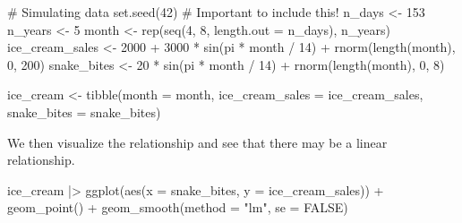 \documentclass[
  letterpaper,
  DIV=11,
  numbers=noendperiod]{scrreprt}
\newenvironment{Shaded}{\begin{snugshade}}{\end{snugshade}}
\newcommand{\AttributeTok}[1]{\textcolor[rgb]{0.40,0.45,0.13}{#1}}
\newcommand{\CommentTok}[1]{\textcolor[rgb]{0.37,0.37,0.37}{#1}}
\newcommand{\ConstantTok}[1]{\textcolor[rgb]{0.56,0.35,0.01}{#1}}
\newcommand{\DecValTok}[1]{\textcolor[rgb]{0.68,0.00,0.00}{#1}}
\newcommand{\FunctionTok}[1]{\textcolor[rgb]{0.28,0.35,0.67}{#1}}
\newcommand{\NormalTok}[1]{\textcolor[rgb]{0.00,0.23,0.31}{#1}}
\newcommand{\OtherTok}[1]{\textcolor[rgb]{0.00,0.23,0.31}{#1}}
\newcommand{\SpecialCharTok}[1]{\textcolor[rgb]{0.37,0.37,0.37}{#1}}
\newcommand{\StringTok}[1]{\textcolor[rgb]{0.13,0.47,0.30}{#1}}
\begin{document}
\begin{Shaded}
\begin{Highlighting}[]
\CommentTok{\# Simulating data}
\FunctionTok{set.seed}\NormalTok{(}\DecValTok{42}\NormalTok{) }\CommentTok{\# Important to include this!}
\NormalTok{n\_days }\OtherTok{\textless{}{-}} \DecValTok{153} 
\NormalTok{n\_years }\OtherTok{\textless{}{-}} \DecValTok{5}
\NormalTok{month }\OtherTok{\textless{}{-}} \FunctionTok{rep}\NormalTok{(}\FunctionTok{seq}\NormalTok{(}\DecValTok{4}\NormalTok{, }\DecValTok{8}\NormalTok{, }\AttributeTok{length.out =}\NormalTok{ n\_days), n\_years)}
\NormalTok{ice\_cream\_sales }\OtherTok{\textless{}{-}} \DecValTok{2000} \SpecialCharTok{+} \DecValTok{3000} \SpecialCharTok{*} \FunctionTok{sin}\NormalTok{(pi }\SpecialCharTok{*}\NormalTok{ month }\SpecialCharTok{/} \DecValTok{14}\NormalTok{) }\SpecialCharTok{+} \FunctionTok{rnorm}\NormalTok{(}\FunctionTok{length}\NormalTok{(month), }\DecValTok{0}\NormalTok{, }\DecValTok{200}\NormalTok{)}
\NormalTok{snake\_bites }\OtherTok{\textless{}{-}} \DecValTok{20} \SpecialCharTok{*} \FunctionTok{sin}\NormalTok{(pi }\SpecialCharTok{*}\NormalTok{ month }\SpecialCharTok{/} \DecValTok{14}\NormalTok{) }\SpecialCharTok{+} \FunctionTok{rnorm}\NormalTok{(}\FunctionTok{length}\NormalTok{(month), }\DecValTok{0}\NormalTok{, }\DecValTok{8}\NormalTok{)}

\NormalTok{ice\_cream }\OtherTok{\textless{}{-}} \FunctionTok{tibble}\NormalTok{(}\AttributeTok{month =}\NormalTok{ month, }\AttributeTok{ice\_cream\_sales =}\NormalTok{ ice\_cream\_sales, }\AttributeTok{snake\_bites =}\NormalTok{ snake\_bites)}
\end{Highlighting}
\end{Shaded}

We then visualize the relationship and see that there may be a linear
relationship.

\begin{Shaded}
\begin{Highlighting}[]
\NormalTok{ice\_cream }\SpecialCharTok{|\textgreater{}} 
  \FunctionTok{ggplot}\NormalTok{(}\FunctionTok{aes}\NormalTok{(}\AttributeTok{x =}\NormalTok{ snake\_bites, }\AttributeTok{y =}\NormalTok{ ice\_cream\_sales)) }\SpecialCharTok{+} 
  \FunctionTok{geom\_point}\NormalTok{() }\SpecialCharTok{+} 
  \FunctionTok{geom\_smooth}\NormalTok{(}\AttributeTok{method =} \StringTok{"lm"}\NormalTok{, }\AttributeTok{se =} \ConstantTok{FALSE}\NormalTok{)}
\end{Highlighting}
\end{Shaded}
\end{document}
